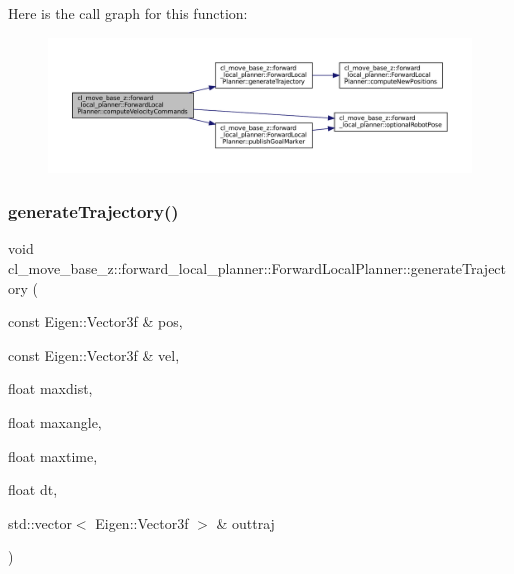 Here is the call graph for this function\+:
\nopagebreak
\begin{figure}[H]
\begin{center}
\leavevmode
\includegraphics[width=350pt]{classcl__move__base__z_1_1forward__local__planner_1_1ForwardLocalPlanner_a1b87a4f9f107c7727c155c4afcb90700_cgraph}
\end{center}
\end{figure}
\mbox{\label{classcl__move__base__z_1_1forward__local__planner_1_1ForwardLocalPlanner_a3e852f81ccae82c56d7f25e56def899c}} 
\subsubsection{\texorpdfstring{generate\+Trajectory()}{generateTrajectory()}}
{\footnotesize\ttfamily void cl\+\_\+move\+\_\+base\+\_\+z\+::forward\+\_\+local\+\_\+planner\+::\+Forward\+Local\+Planner\+::generate\+Trajectory (\begin{DoxyParamCaption}\item[{const Eigen\+::\+Vector3f \&}]{pos,  }\item[{const Eigen\+::\+Vector3f \&}]{vel,  }\item[{float}]{maxdist,  }\item[{float}]{maxangle,  }\item[{float}]{maxtime,  }\item[{float}]{dt,  }\item[{std\+::vector$<$ Eigen\+::\+Vector3f $>$ \&}]{outtraj }\end{DoxyParamCaption})\hspace{0.3cm}{\ttfamily [private]}}




